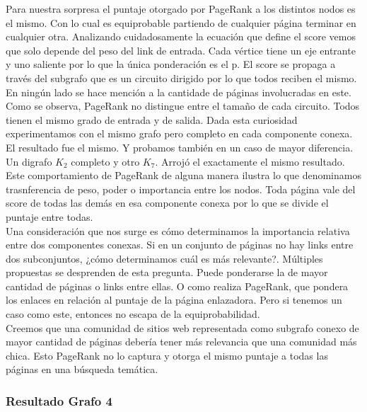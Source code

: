 Para nuestra sorpresa el puntaje otorgado por PageRank a los distintos nodos es el mismo. Con lo cual es equiprobable partiendo de cualquier página terminar en cualquier otra. Analizando cuidadosamente la ecuación que define el score vemos que solo depende del peso del link de entrada. Cada vértice tiene un eje entrante y uno saliente por lo que la única ponderación es el p. El score se propaga a través del subgrafo que es un circuito dirigido por lo que todos reciben el mismo. En ningún lado se hace mención a la cantidade de páginas involucradas en este. \\

Como se observa, PageRank no distingue entre el tamaño de cada circuito. Todos tienen el mismo grado de entrada y de salida. Dada esta curiosidad experimentamos con el mismo grafo pero completo en cada componente conexa. El resultado fue el mismo. Y probamos también en un caso de mayor diferencia. Un digrafo $K_{2}$ completo y otro $K_{7}$. Arrojó el exactamente el mismo resultado. \\

Este comportamiento de PageRank de alguna manera ilustra lo que denominamos trasnferencia de peso, poder o importancia entre los nodos. Toda página vale del score de todas las demás en esa componente conexa por lo que se divide el puntaje entre todas. \\

Una consideración que nos surge es cómo determinamos la importancia relativa entre dos componentes conexas. Si en un conjunto de páginas no hay links entre dos subconjuntos, ¿cómo determinamos cuál es más relevante?. Múltiples propuestas se desprenden de esta pregunta. Puede ponderarse la de mayor cantidad de páginas o links entre ellas. O como realiza PageRank, que pondera los enlaces en relación al puntaje de la página enlazadora. Pero si tenemos un caso como este,
entonces no escapa de la equiprobabilidad.\\

Creemos que una comunidad de sitios web representada como subgrafo conexo de mayor cantidad de páginas debería tener más relevancia que una comunidad más chica. Esto PageRank no lo captura y otorga el mismo puntaje a todas las páginas en una búsqueda temática. \\
            
\subsubsection{Resultado Grafo 4} 

